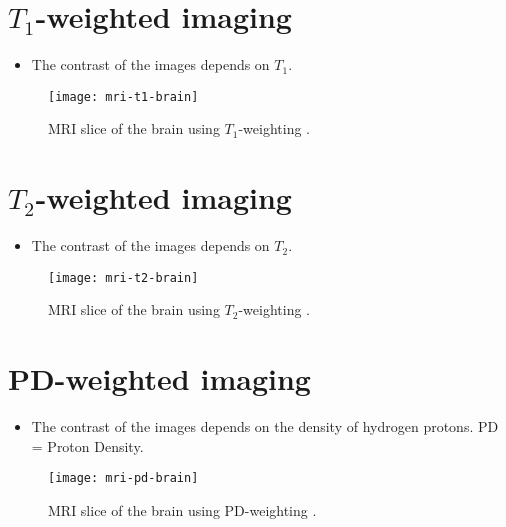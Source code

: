 \section{$T_1$-weighted imaging}
\begin{itemize}
\item The contrast of the images depends on $T_1$.
\end{itemize}
\vspace{-3ex}
\begin{figure}[!b]
  \centering
  \texttt{[image: mri-t1-brain]}
  \caption{MRI slice of the brain using $T_1$-weighting \cite{abdulla2025MRI_weighting}.}
  \label{fig:MRI-T1-weighting}
\end{figure}

\section{$T_2$-weighted imaging}
\begin{itemize}
\item The contrast of the images depends on $T_2$.
\end{itemize}
\vspace{-3ex}
\begin{figure}[!b]
  \centering
  \texttt{[image: mri-t2-brain]}
  \caption{MRI slice of the brain using $T_2$-weighting \cite{abdulla2025MRI_weighting}.}
  \label{fig:MRI-T2-weighting}
\end{figure}

\section{PD-weighted imaging}
\begin{itemize}
\item The contrast of the images depends on the density of hydrogen
  protons. PD = Proton Density.
\end{itemize}
\vspace{-3ex}
\begin{figure}[!b]
  \centering
  \texttt{[image: mri-pd-brain]}
  \caption{MRI slice of the brain using PD-weighting \cite{abdulla2025MRI_weighting}.}
  \label{fig:MRI-PD-weighting}
\end{figure}

